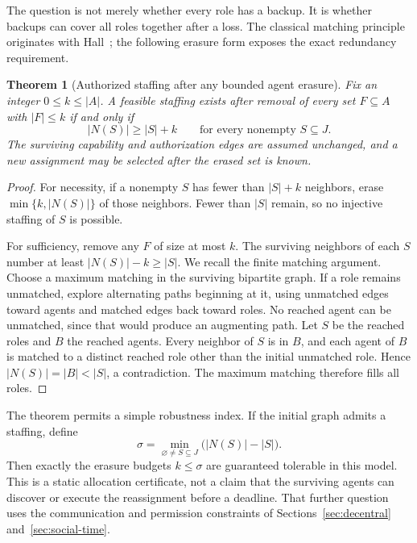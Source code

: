 \documentclass[11pt,letterpaper]{article}
\theoremstyle{plain}
\newtheorem{theorem}[proposition]{Theorem}
\theoremstyle{definition}
\theoremstyle{remark}
\begin{document}
The question is not merely whether every role has a backup. It is whether backups can cover all roles together after a loss. The classical matching principle originates with Hall~\cite{hall1935}; the following erasure form exposes the exact redundancy requirement.

\begin{theorem}[Authorized staffing after any bounded agent erasure]\label{thm:robust-staffing}
Fix an integer $0\leq k\leq |A|$. A feasible staffing exists after removal of every set $F\subseteq A$ with $|F|\leq k$ if and only if
\begin{equation}\label{eq:robust-hall}
|N(S)|\geq |S|+k
\qquad\text{for every nonempty }S\subseteq J.
\end{equation}
The surviving capability and authorization edges are assumed unchanged, and a new assignment may be selected after the erased set is known.
\end{theorem}
\begin{proof}
For necessity, if a nonempty $S$ has fewer than $|S|+k$ neighbors, erase $\min\{k,|N(S)|\}$ of those neighbors. Fewer than $|S|$ remain, so no injective staffing of $S$ is possible.

For sufficiency, remove any $F$ of size at most $k$. The surviving neighbors of each $S$ number at least $|N(S)|-k\geq|S|$. We recall the finite matching argument. Choose a maximum matching in the surviving bipartite graph. If a role remains unmatched, explore alternating paths beginning at it, using unmatched edges toward agents and matched edges back toward roles. No reached agent can be unmatched, since that would produce an augmenting path. Let $S$ be the reached roles and $B$ the reached agents. Every neighbor of $S$ is in $B$, and each agent of $B$ is matched to a distinct reached role other than the initial unmatched role. Hence $|N(S)|=|B|<|S|$, a contradiction. The maximum matching therefore fills all roles.
\end{proof}

The theorem permits a simple robustness index. If the initial graph admits a staffing, define
\[
\sigma=\min_{\varnothing\ne S\subseteq J}\bigl(|N(S)|-|S|\bigr).
\]
Then exactly the erasure budgets $k\leq\sigma$ are guaranteed tolerable in this model. This is a static allocation certificate, not a claim that the surviving agents can discover or execute the reassignment before a deadline. That further question uses the communication and permission constraints of Sections~\ref{sec:decentral} and~\ref{sec:social-time}.
\end{document}
